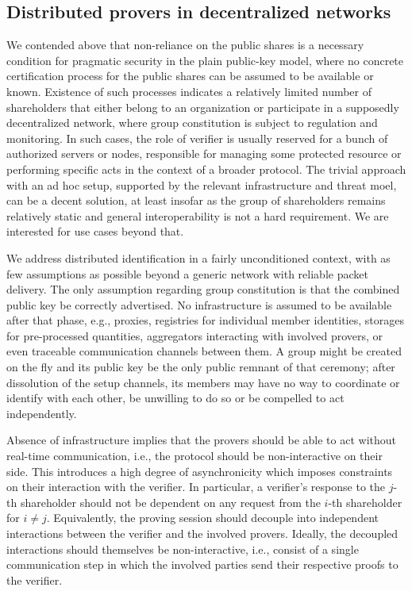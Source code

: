 \documentclass{iacrtrans}
\begin{document}
\subsection{Distributed provers in decentralized networks}\label{section_distributed_provers}

We contended above that non-reliance on the public shares
is a necessary condition for pragmatic security
in the plain public-key model, where
no concrete certification process
for the public shares can be assumed
to be available or known.
Existence of such processes indicates
a relatively limited number of shareholders
that either belong to an organization or participate
in a supposedly decentralized network,
where group constitution is subject to
regulation and monitoring.
In such cases,
the role of verifier is usually reserved for
a bunch of authorized servers or nodes,
responsible for managing some protected resource or
performing specific acts in the context of a broader protocol.
The trivial approach with an ad hoc setup,
supported by the relevant infrastructure
and threat moel,
can be a decent solution,
at least insofar as the group of shareholders
remains relatively static
and general interoperability
is not a hard requirement.
We are interested for use cases beyond that.

We address distributed identification in
a fairly unconditioned context,
with as few assumptions as possible
beyond a generic network
with reliable packet delivery.
The only assumption regarding
group constitution is that
the combined public key
be correctly advertised.
No infrastructure is
assumed to be available after that phase,
e.g., proxies, registries for individual member identities,
storages for pre-processed quantities,
aggregators interacting with involved provers,
or even traceable communication channels between them.
A group might be created on the fly and its public key
be the only public remnant of that ceremony;
after dissolution of the setup channels,
its members may have no way to coordinate or identify
with each other, be unwilling to do so or be compelled to
act independently.

Absence of infrastructure implies that
the provers should be able to
act without real-time communication,
i.e., the protocol should be
non-interactive on their side.
This introduces a high degree of asynchronicity
which imposes constraints on their interaction
with the verifier.
In particular, a verifier's response
to the $j$-th shareholder should not be dependent
on any request from the $i$-th shareholder for $i \neq j$.
Equivalently, the proving session should decouple into
independent interactions between the verifier
and the involved provers.
Ideally, the decoupled interactions should themselves be
non-interactive, i.e., consist of a single communication
step in which the involved parties send their respective
proofs to the verifier.
\end{document}
